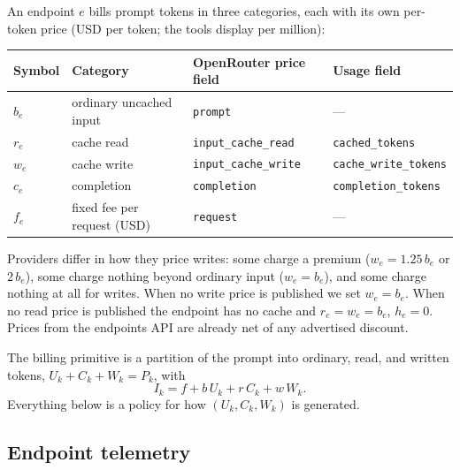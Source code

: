 \documentclass[11pt]{article}
\begin{document}
An endpoint $e$ bills prompt tokens in three categories, each with its own
per-token price (USD per token; the tools display per million):
\begin{center}
\begin{tabular}{@{}llll@{}}
\toprule
Symbol & Category & OpenRouter price field & Usage field \\
\midrule
$b_e$ & ordinary uncached input & \texttt{prompt} & --- \\
$r_e$ & cache read & \texttt{input\_cache\_read} & \texttt{cached\_tokens} \\
$w_e$ & cache write & \texttt{input\_cache\_write} & \texttt{cache\_write\_tokens} \\
$c_e$ & completion & \texttt{completion} & \texttt{completion\_tokens} \\
$f_e$ & fixed fee per request (USD) & \texttt{request} & --- \\
\bottomrule
\end{tabular}
\end{center}
Providers differ in how they price writes: some charge a premium
($w_e = 1.25\,b_e$ or $2\,b_e$), some charge nothing beyond ordinary input
($w_e = b_e$), and some charge nothing at all for writes. When no write price
is published we set $w_e = b_e$. When no read price is published the endpoint
has no cache and $r_e = w_e = b_e$, $h_e = 0$. Prices from the endpoints API
are already net of any advertised discount.

The billing primitive is a partition of the prompt into ordinary, read, and
written tokens, $U_k + C_k + W_k = P_k$, with
\begin{equation}\label{eq:partition}
  I_k = f + b\,U_k + r\,C_k + w\,W_k .
\end{equation}
Everything below is a policy for how $(U_k, C_k, W_k)$ is generated.

\subsection{Endpoint telemetry}
\end{document}
